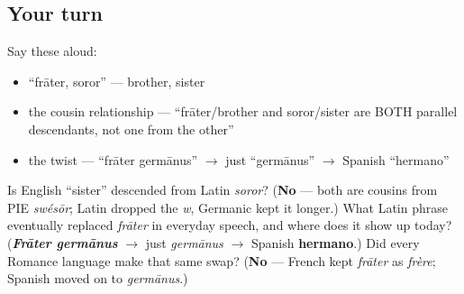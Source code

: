 \subsection*{Your turn}
Say these aloud:

\begin{itemize}
\raggedright
  \item \textquotedblleft{}frāter, soror\textquotedblright{} — brother, sister
  \item the cousin relationship — \textquotedblleft{}frāter/brother and soror/sister are BOTH parallel descendants, not one from the other\textquotedblright{}
  \item the twist — \textquotedblleft{}frāter germānus\textquotedblright{} $\to$ just \textquotedblleft{}germānus\textquotedblright{} $\to$ Spanish \textquotedblleft{}hermano\textquotedblright{}
\end{itemize}

\begin{tcolorbox}[breakable,colback=teal!4,colframe=teal!35!black,title={Before you move on}]
Is English \textquotedblleft{}sister\textquotedblright{} descended from Latin \emph{soror}? (\textbf{No} — both are cousins from PIE \emph{swésōr}; Latin dropped the \emph{w}, Germanic kept it longer.) What Latin phrase eventually replaced \emph{frāter} in everyday speech, and where does it show up today? (\emph{\textbf{Frāter germānus}} $\to$ just \emph{germānus} $\to$ Spanish \textbf{hermano}.) Did every Romance language make that same swap? (\textbf{No} — French kept \emph{frāter} as \emph{frère}; Spanish moved on to \emph{germānus}.)
\end{tcolorbox}
